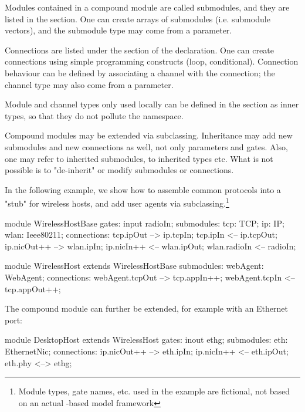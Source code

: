 Modules contained in a compound module are called submodules, and they are
listed in the  section. One can create arrays of submodules
(i.e. submodule vectors), and the submodule type may come from a parameter.

Connections are listed under the  section of the
declaration. One can create connections using simple programming constructs
(loop, conditional). Connection behaviour can be defined by associating a
channel with the connection; the channel type may also come from a
parameter.

Module and channel types only used locally can be defined in the
 section as inner types, so that they do not pollute the
namespace.

Compound modules may be extended via subclassing. Inheritance may add new
submodules and new connections as well, not only parameters and gates.
Also, one may refer to inherited submodules, to inherited types etc. What
is not possible is to "de-inherit" or modify submodules or connections.

In the following example, we show how to assemble common protocols
into a "stub" for wireless hosts, and add user agents via
subclassing.\footnote{Module types, gate names, etc. used in the example
are fictional, not based on an actual {\opp}-based model framework}

\begin{ned}
module WirelessHostBase
{
   gates:
       input radioIn;
   submodules:
       tcp: TCP;
       ip: IP;
       wlan: Ieee80211;
   connections:
       tcp.ipOut --> ip.tcpIn;
       tcp.ipIn <-- ip.tcpOut;
       ip.nicOut++ --> wlan.ipIn;
       ip.nicIn++ <-- wlan.ipOut;
       wlan.radioIn <-- radioIn;
}

module WirelessHost extends WirelessHostBase
{
   submodules:
       webAgent: WebAgent;
   connections:
       webAgent.tcpOut --> tcp.appIn++;
       webAgent.tcpIn <-- tcp.appOut++;
}
\end{ned}

The  compound module can further be extended,
for example with an Ethernet port:

\begin{ned}
module DesktopHost extends WirelessHost
{
   gates:
       inout ethg;
   submodules:
       eth: EthernetNic;
   connections:
       ip.nicOut++ --> eth.ipIn;
       ip.nicIn++ <-- eth.ipOut;
       eth.phy <--> ethg;
}
\end{ned}




